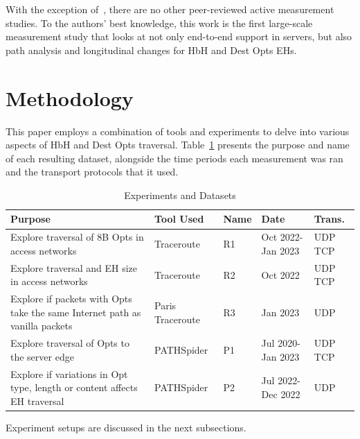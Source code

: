 \documentclass[conference]{IEEEtran}
\begin{document}
With the exception of~\cite{james-imc}, there are no other peer-reviewed active measurement studies. To the authors' best knowledge, this work is the first large-scale measurement study that looks at not only end-to-end support in servers, but also path analysis and longitudinal changes for HbH and Dest Opts EHs.

\section{Methodology} 
\label{sec:methodology}

This paper employs a combination of tools and experiments to delve into various aspects of HbH and Dest Opts traversal. Table~\ref{tbl:datasets} presents the purpose and name of each resulting dataset, alongside the time periods each measurement was ran and the transport protocols that it used.

\begin{table}[h]
\begin{tabular}{p{}|p{}|p{}|p{}|p{}}
Purpose                                                                          & Tool Used        & Name & Date               & Trans. \\
\hline
Explore traversal of 8B Opts in access networks                                  & Traceroute       & R1           & Oct 2022- Jan 2023 & UDP TCP          \\
\hline
Explore traversal and EH size in access networks                                & Traceroute       & R2           & Oct 2022           & UDP TCP          \\
\hline
Explore if packets with Opts take the same Internet path as vanilla packets & Paris Traceroute & R3           & Jan 2023           & UDP               \\
\hline
Explore traversal of Opts to the server edge                              & PATHSpider       & P1           & Jul 2020- Jan 2023 & UDP TCP          \\
\hline
Explore if variations in Opt type, length or content affects EH traversal   & PATHSpider       & P2           & Jul 2022- Dec 2022     & UDP              
\end{tabular}
  \caption{Experiments and Datasets}
  \label{tbl:datasets}
\end{table}

Experiment setups are discussed in the next subsections.
\end{document}
